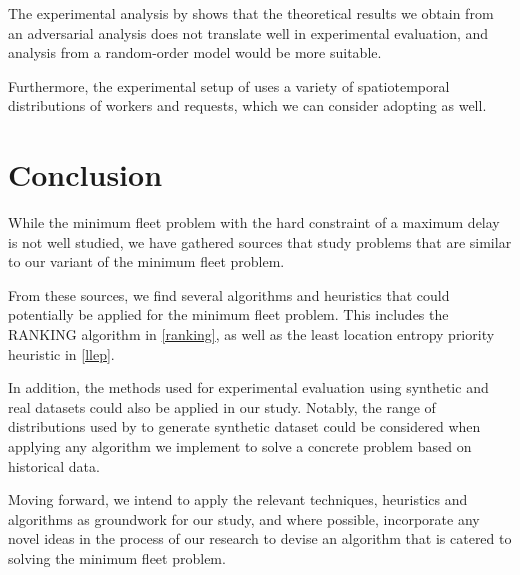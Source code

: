 \documentclass[urop]{socreport}
\begin{document}
The experimental analysis by \cite{tong} shows that the theoretical results we obtain from an adversarial analysis does not translate well in experimental evaluation, and analysis from a random-order model would be more suitable.

Furthermore, the experimental setup of \cite{tong} uses a variety of spatiotemporal distributions of workers and requests, which we can consider adopting as well.

\chapter{Conclusion}
While the minimum fleet problem with the hard constraint of a maximum delay is not well studied, we have gathered sources that study problems that are similar to our variant of the minimum fleet problem.

From these sources, we find several algorithms and heuristics that could potentially be applied for the minimum fleet problem. This includes the RANKING algorithm in \ref{ranking}, as well as the least location entropy priority heuristic in \ref{llep}.

In addition, the methods used for experimental evaluation using synthetic and real datasets could also be applied in our study. Notably, the range of distributions used by \cite{tong} to generate synthetic dataset could be considered when applying any algorithm we implement to solve a concrete problem based on historical data.

Moving forward, we intend to apply the relevant techniques, heuristics and algorithms as groundwork for our study, and where possible, incorporate any novel ideas in the process of our research to devise an algorithm that is catered to solving the minimum fleet problem.



\end{document}

